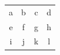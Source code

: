 \documentclass{article}
\begin{document}
\begin{tabular}{|c|c|c|c|}
\hhline{|*{4}{-|}}
a&b&c&d\\
\hhline{~~--}
e&f&g&h\\
\hhline{|=|=:~:-|}
i&j&k&l\\
\end{tabular}
\end{document}
